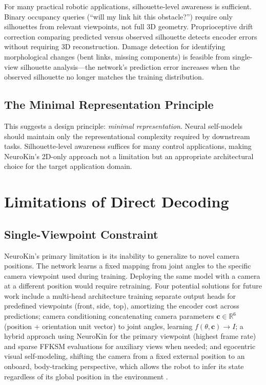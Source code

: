 \documentclass[12pt,a4paper,oneside]{report}
\begin{document}
For many practical robotic applications, silhouette-level awareness is sufficient. Binary occupancy queries (``will my link hit this obstacle?'') require only silhouettes from relevant viewpoints, not full 3D geometry. Proprioceptive drift correction comparing predicted versus observed silhouette detects encoder errors without requiring 3D reconstruction. Damage detection for identifying morphological changes (bent links, missing components) is feasible from single-view silhouette analysis—the network's prediction error increases when the observed silhouette no longer matches the training distribution.

\subsection{The Minimal Representation Principle}
\label{subsec:the_minimal_representation_principle}

This suggests a design principle: \textit{minimal representation}. Neural self-models should maintain only the representational complexity required by downstream tasks. Silhouette-level awareness suffices for many control applications, making NeuroKin's 2D-only approach not a limitation but an appropriate architectural choice for the target application domain.

\section{Limitations of Direct Decoding}

\subsection{Single-Viewpoint Constraint}
\label{subsec:single_viewpoint_constraint}

NeuroKin's primary limitation is its inability to generalize to novel camera positions. The network learns a fixed mapping from joint angles to the specific camera viewpoint used during training. Deploying the same model with a camera at a different position would require retraining. Four potential solutions for future work include a multi-head architecture training separate output heads for predefined viewpoints (front, side, top), amortizing the encoder cost across predictions; camera conditioning concatenating camera parameters $\mathbf{c} \in \mathbb{R}^6$ (position + orientation unit vector) to joint angles, learning $f(\theta, \mathbf{c}) \rightarrow I$; a hybrid approach using NeuroKin for the primary viewpoint (highest frame rate) and sparse FFKSM evaluations for auxiliary views when needed; and egocentric visual self-modeling, shifting the camera from a fixed external position to an onboard, body-tracking perspective, which allows the robot to infer its state regardless of its global position in the environment \cite{hu2024egocentric}.
\end{document}
